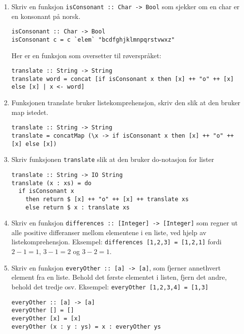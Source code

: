 \documentclass{article}
\begin{document}
\begin{enumerate}[label=\alph*)]
    \item Skriv en funksjon \texttt{isConsonant :: Char -> Bool} som sjekker om en char er en konsonant på norsk.
        \begin{lstlisting}
isConsonant :: Char -> Bool
isConsonant c = c `elem` "bcdfghjklmnpqrstvwxz"
        \end{lstlisting}

Her er en funksjon som oversetter til røverspråket:

\begin{lstlisting}
translate :: String -> String
translate word = concat [if isConsonant x then [x] ++ "o" ++ [x] else [x] | x <- word]
\end{lstlisting}

\item Funksjonen translate bruker listekomprehensjon, skriv den slik at den bruker map istedet.
    \begin{lstlisting}
translate :: String -> String
translate = concatMap (\x -> if isConsonant x then [x] ++ "o" ++ [x] else [x])
    \end{lstlisting}

\item Skriv funksjonen \texttt{translate} slik at den bruker do-notasjon for lister

    \begin{lstlisting}
translate :: String -> IO String
translate (x : xs) = do
  if isConsonant x
    then return $ [x] ++ "o" ++ [x] ++ translate xs
    else return $ x : translate xs
    \end{lstlisting}

\item Skriv en funksjon \texttt{differences :: [Integer] -> [Integer]} som regner ut alle positive differanser mellom elementene i en liste, ved hjelp av listekomprehensjon. Eksempel: \texttt{differences [1,2,3] = [1,2,1]} fordi \( 2 - 1 = 1 \), \( 3 - 1 = 2 \) og \( 3 - 2 = 1 \).

\item Skriv en funksjon \texttt{everyOther :: [a] -> [a]}, som fjerner annethvert element fra en liste. Behold det første elementet i listen, fjern det andre, behold det tredje osv. Eksempel: \texttt{everyOther [1,2,3,4] = [1,3]}
    \begin{lstlisting}
everyOther :: [a] -> [a]
everyOther [] = []
everyOther [x] = [x]
everyOther (x : y : ys) = x : everyOther ys
        
    \end{lstlisting}
\end{enumerate}
\end{document}
